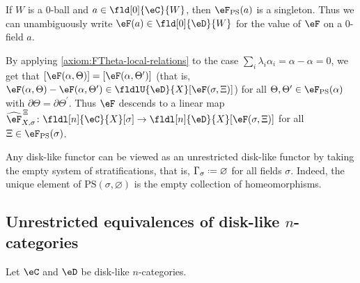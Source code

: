 \documentclass[12pt,reqno]{amsart}
\newcounter{alpha}\renewcommand\thealpha{\upshape\Alph{alpha}}
\newcommand{\C}{\eC}
\newcommand{\D}{\eD}
\DeclareRobustCommand{\coloneq}{\mathrel{\vcenter{\baselineskip0.5ex\lineskiplimit0pt\hbox{\scriptsize{\upshape.}}\hbox{\scriptsize{\upshape.}}}}=}
\begin{document}
\begin{remark}
If $W$ is a $0$-ball and $a\in\fld[0]{\C}{W}$, then $\eF_{\mathrm{PS}}(a)$ is a singleton. Thus we can unambiguously write $\eF(a)\in\fld[0]{\D}{W}$ for the value of $\eF$ on a $0$-field $a$.
\end{remark}

\begin{remark}
\label{dldldl}
By applying \ref{axiom:FTheta-local-relations} to the case $\sum_i\lambda_i\alpha_i=\alpha-\alpha=0$, we get that $[\eF(\alpha,\Theta)]=[\eF(\alpha,\Theta^\prime)]$ (that is, $\eF(\alpha,\Theta)-\eF(\alpha,\Theta^\prime)\in\fldlU{\D}{X}[\eF(\sigma,\Xi)]$) for all $\Theta,\Theta^\prime\in\eF_{\mathrm{PS}}(\alpha)$ with $\partial\Theta=\partial\Theta^\prime$. Thus $\eF$ descends to a linear map $\widehat{\eF}^{\,\Xi}_{X,\sigma}\colon\fldl[n]{\C}{X}[\sigma]\to\fldl[n]{\D}{X}[\eF(\sigma,\Xi)]$ for all $\Xi\in\eF_{\mathrm{PS}}(\sigma)$.
\end{remark}

\begin{remark} 
\label{dlurl}
Any disk-like functor can be viewed as an unrestricted disk-like functor by taking the empty system of stratifications, that is, $\Gamma_\sigma \coloneq \varnothing$ for all fields $\sigma$. Indeed, the unique element of $\mathrm{PS}(\sigma, \varnothing)$ is the empty collection of homeomorphisms.
\end{remark}

\subsection{Unrestricted equivalences of disk-like \texorpdfstring{$n$}{n}-categories}
\label{sec:unrestricted-equivalences}
Let $\C$ and $\D$ be disk-like $n$-categories.
\end{document}

